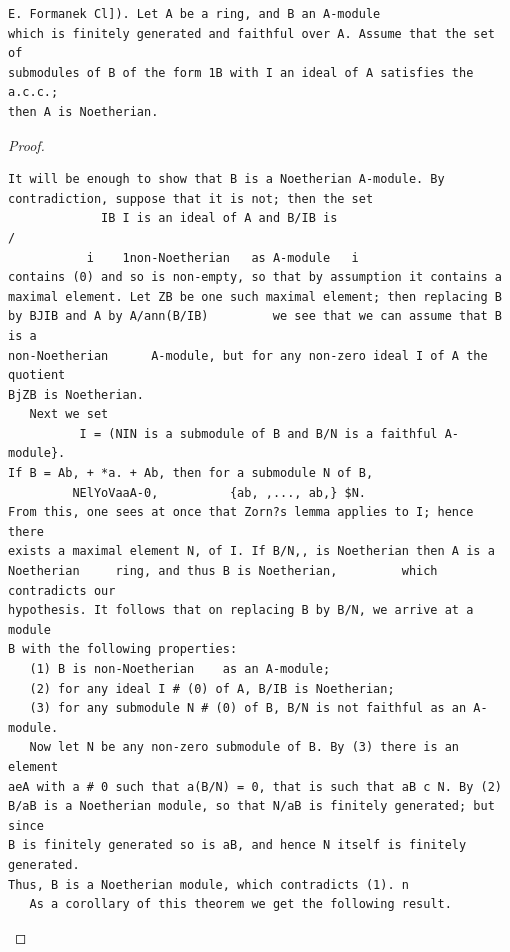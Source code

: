\begin{theorem}\label{mcrt-auto-theorem-3-6}\uses{}
\begin{verbatim}
E. Formanek Cl]). Let A be a ring, and B an A-module
which is finitely generated and faithful over A. Assume that the set of
submodules of B of the form 1B with I an ideal of A satisfies the a.c.c.;
then A is Noetherian.
\end{verbatim}
\end{theorem}
\begin{proof}
\begin{verbatim}
It will be enough to show that B is a Noetherian A-module. By
contradiction, suppose that it is not; then the set
             IB I is an ideal of A and B/IB is                               /
           i    1non-Noetherian   as A-module   i
contains (0) and so is non-empty, so that by assumption it contains a
maximal element. Let ZB be one such maximal element; then replacing B
by BJIB and A by A/ann(B/IB)         we see that we can assume that B is a
non-Noetherian      A-module, but for any non-zero ideal I of A the quotient
BjZB is Noetherian.
   Next we set
          I = (NIN is a submodule of B and B/N is a faithful A-module}.
If B = Ab, + *a. + Ab, then for a submodule N of B,
         NElYoVaaA-0,          {ab, ,..., ab,} $N.
From this, one sees at once that Zorn?s lemma applies to I; hence there
exists a maximal element N, of I. If B/N,, is Noetherian then A is a
Noetherian     ring, and thus B is Noetherian,         which contradicts our
hypothesis. It follows that on replacing B by B/N, we arrive at a module
B with the following properties:
   (1) B is non-Noetherian    as an A-module;
   (2) for any ideal I # (0) of A, B/IB is Noetherian;
   (3) for any submodule N # (0) of B, B/N is not faithful as an A-module.
   Now let N be any non-zero submodule of B. By (3) there is an element
aeA with a # 0 such that a(B/N) = 0, that is such that aB c N. By (2)
B/aB is a Noetherian module, so that N/aB is finitely generated; but since
B is finitely generated so is aB, and hence N itself is finitely generated.
Thus, B is a Noetherian module, which contradicts (1). n
   As a corollary of this theorem we get the following result.
\end{verbatim}
\end{proof}


